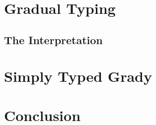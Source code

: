 \documentclass{entcs}
\begin{document}
\section{Gradual Typing}
\label{sec:gradual_typing}



\subsection{The Interpretation}
\label{subsec:the_interpretation}


\section{Simply Typed Grady}
\label{sec:sl-grady}


\section{Conclusion}
\label{sec:conclusion}






\appendix



\end{document}
